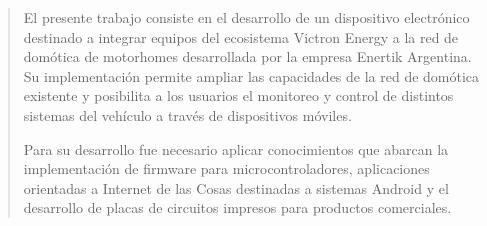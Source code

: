 \documentclass[
    11pt,
    spanish,
    singlespacing,
    parskip,
    headsepline,
    bookmarks=true,
    unicode=true,
    pdftoolbar=true,
    pdfmenubar=true,
    pdffitwindow=false,
    colorlinks=true,
    linkcolor=blue,
    citecolor=blue,
    urlcolor=blue
]{MastersDoctoralThesis}
\def\textbf#1{#1}%
\begin{document}



\frontmatter %
\pagestyle{plain} %


\begin{abstract}
\addchaptertocentry{\abstractname} %
El presente trabajo consiste en el desarrollo de un dispositivo electrónico destinado a integrar equipos del ecosistema Victron Energy a la red de domótica de motorhomes desarrollada por la empresa Enertik Argentina.
Su implementación permite ampliar las capacidades de la red de domótica existente y posibilita a los usuarios el monitoreo y control de distintos sistemas del vehículo a través de dispositivos móviles.

Para su desarrollo fue necesario aplicar conocimientos que abarcan la implementación de firmware para microcontroladores, aplicaciones orientadas a Internet de las Cosas destinadas a sistemas Android y el desarrollo de placas de circuitos impresos para productos comerciales.
\end{abstract}




\tableofcontents
\listoffigures

\end{document}
